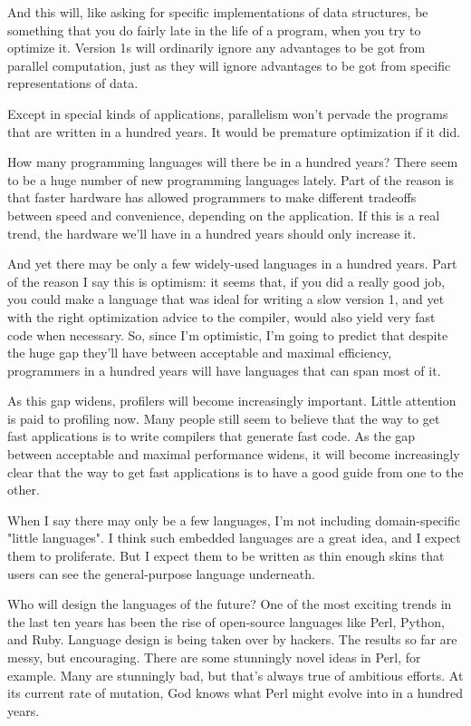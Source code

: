 And this will, like asking for specific implementations of data
structures, be something that you do fairly late in the life of a
program, when you try to optimize it.  Version 1s will ordinarily
ignore any advantages to be got from parallel computation, just
as they will ignore advantages to be got from specific representations
of data.

Except in special kinds of applications, parallelism won't
pervade the programs that are written in a hundred years.  It would be
premature optimization if it did.



How many programming languages will there
be in a hundred years?  There seem to be a huge number of new
programming languages lately.  Part of the reason is that
faster hardware has allowed programmers to make different
tradeoffs between speed and convenience, depending on the
application.  If this is a real trend, the hardware we'll  
have in a hundred years should only increase it.

And yet there may be only a few widely-used languages in a
hundred years.  Part of the reason I say this
is optimism: it seems that, if you did a really good job,
you could make a language that was ideal for writing a   
slow version 1, and yet with the right optimization advice
to the compiler, would also yield very fast code when necessary.
So, since I'm optimistic, I'm going to predict that despite
the huge gap they'll have between acceptable and maximal
efficiency, programmers in a hundred years will have languages 
that can span most of it.

As this gap widens, profilers will become increasingly important.
Little attention is paid to profiling now.  Many people still
seem to believe that the way to get fast applications is to
write compilers that generate fast code.  As the gap between    
acceptable and maximal performance widens, it will become
increasingly clear that the way to get fast applications is   
to have a good guide from one to the other.

When I say there may only be a few languages, I'm not including
domain-specific "little languages".  I think such embedded languages
are a great idea, and I expect them to proliferate.  But I expect
them to be written as thin enough skins that users can see
the general-purpose language underneath.



Who will design the languages of the future?  One of the most exciting
trends in the last ten years has been the rise of open-source  
languages like Perl, Python, and Ruby.
Language design is being taken over by hackers.  The results
so far are messy, but encouraging.  There are some stunningly  
novel ideas in Perl, for example. Many are stunningly bad, but
that's always true of ambitious efforts.  At its current rate
of mutation, God knows what Perl might evolve into in a hundred
years.

